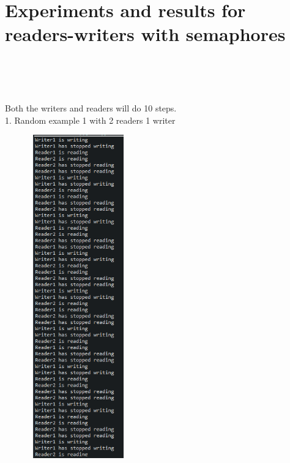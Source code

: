 \documentclass[14pt]{article}
\begin{document}
\section*{Experiments and results for readers-writers with semaphores}
\\\\\\
\begin{center}
Both the writers and readers will do 10 steps.\\
1. Random example 1 with 2 readers 1 writer\\
\vspace{10mm}

\includegraphics[height=5.5in, width = 2.5in]{rw1.png}\\
\end{center}\\
\newpage{}
\end{document}
